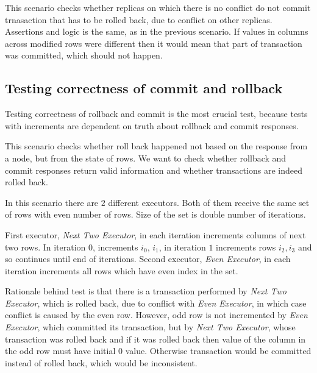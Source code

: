 This scenario checks whether replicas on which there is no conflict do not commit trnasaction that has to be rolled back, due to conflict on other replicas. Assertions and logic is the same, as in the previous scenario. If values in columns across modified rows were different then it would mean that part of transaction was committed, which should not happen.


\subsection{Testing correctness of commit and rollback}
Testing correctness of rollback and commit is the most crucial test, because tests with increments are dependent on truth about rollback and commit responses. 

This scenario checks whether roll back happened not based on the response from a node, but from the state of rows. We want to check whether rollback and commit responses return valid information and whether transactions are indeed rolled back.

In this scenario there are $2$ different executors. Both of them receive the same set of rows with even number of rows. Size of the set is double number of iterations. 

First executor, \emph{Next Two Executor}, in each iteration increments columns of next two rows. In iteration $0$, increments $i_{0}$, $i_{1}$, in iteration $1$ increments rows $i_{2}, i_{3}$ and so continues until end of iterations. Second executor, \emph{Even Executor}, in each iteration increments all rows which have even index in the set.

Rationale behind test is that there is a transaction performed by \emph{Next Two Executor}, which is rolled back, due to conflict with \emph{Even Executor}, in which case conflict is caused by the even row. However, odd row is not incremented by \emph{Even Executor}, which committed its transaction, but by \emph{Next Two Executor}, whose transaction was rolled back and if it was rolled back then value of the column in the odd row must have initial $0$ value.  Otherwise transaction would be committed instead of rolled back, which would be inconsistent.


